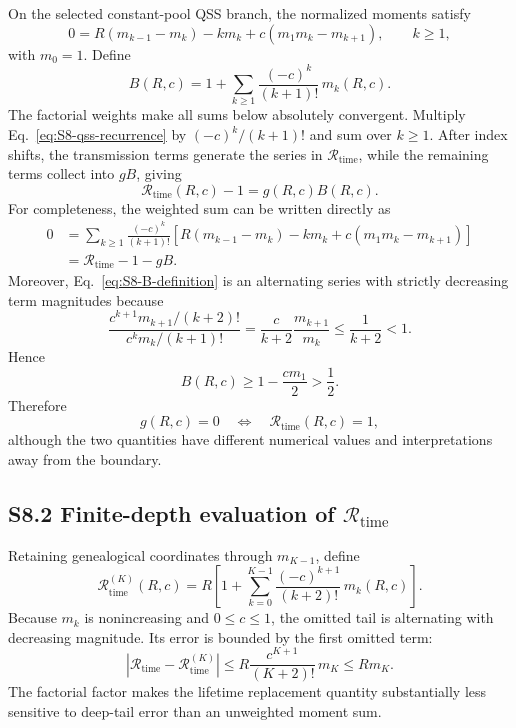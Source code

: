 \documentclass[9pt,a4paper]{article}
\begin{document}
On the selected constant-pool QSS branch, the normalized moments satisfy
\begin{equation}
0=R(m_{k-1}-m_k)-km_k+c(m_1m_k-m_{k+1}),
\qquad k\geq1,
\label{eq:S8-qss-recurrence}
\end{equation}
with $m_0=1$. Define
\begin{equation}
B(R,c)=1+\sum_{k\geq1}\frac{(-c)^k}{(k+1)!}\,m_k(R,c).
\label{eq:S8-B-definition}
\end{equation}
The factorial weights make all sums below absolutely convergent. Multiply Eq.~\eqref{eq:S8-qss-recurrence} by $(-c)^k/(k+1)!$ and sum over $k\geq1$. After index shifts, the transmission terms generate the series in $\mathcal R_{\mathrm{time}}$, while the remaining terms collect into $gB$, giving
\begin{equation}
\mathcal R_{\mathrm{time}}(R,c)-1
=g(R,c)B(R,c).
\label{eq:S8-threshold-identity}
\end{equation}
For completeness, the weighted sum can be written directly as
\begin{align}
0
&=\sum_{k\geq1}\frac{(-c)^k}{(k+1)!}
\left[R(m_{k-1}-m_k)-km_k+c(m_1m_k-m_{k+1})\right] \\
&=\mathcal R_{\mathrm{time}}-1-gB.
\label{eq:S8-weighted-sum}
\end{align}
Moreover, Eq.~\eqref{eq:S8-B-definition} is an alternating series with strictly decreasing term magnitudes because
\begin{equation}
\frac{c^{k+1}m_{k+1}/(k+2)!}{c^km_k/(k+1)!}
=\frac{c}{k+2}\frac{m_{k+1}}{m_k}
\leq\frac{1}{k+2}<1.
\end{equation}
Hence
\begin{equation}
B(R,c)\geq1-\frac{cm_1}{2}>\frac12.
\label{eq:S8-B-positive}
\end{equation}
Therefore
\begin{equation}
g(R,c)=0
\quad\Longleftrightarrow\quad
\mathcal R_{\mathrm{time}}(R,c)=1,
\label{eq:S8-threshold-equivalence}
\end{equation}
although the two quantities have different numerical values and interpretations away from the boundary.

\subsection*{S8.2 Finite-depth evaluation of $\mathcal R_{\mathrm{time}}$}

Retaining genealogical coordinates through $m_{K-1}$, define
\begin{equation}
\mathcal R_{\mathrm{time}}^{(K)}(R,c)
=R\left[
1+\sum_{k=0}^{K-1}\frac{(-c)^{k+1}}{(k+2)!}\,m_k(R,c)
\right].
\label{eq:S8-Rtime-K}
\end{equation}
Because $m_k$ is nonincreasing and $0\leq c\leq1$, the omitted tail is alternating with decreasing magnitude. Its error is bounded by the first omitted term:
\begin{equation}
\left|
\mathcal R_{\mathrm{time}}-
\mathcal R_{\mathrm{time}}^{(K)}
\right|
\leq
R\frac{c^{K+1}}{(K+2)!}\,m_K
\leq Rm_K.
\label{eq:S8-Rtime-tail}
\end{equation}
The factorial factor makes the lifetime replacement quantity substantially less sensitive to deep-tail error than an unweighted moment sum.
\end{document}
